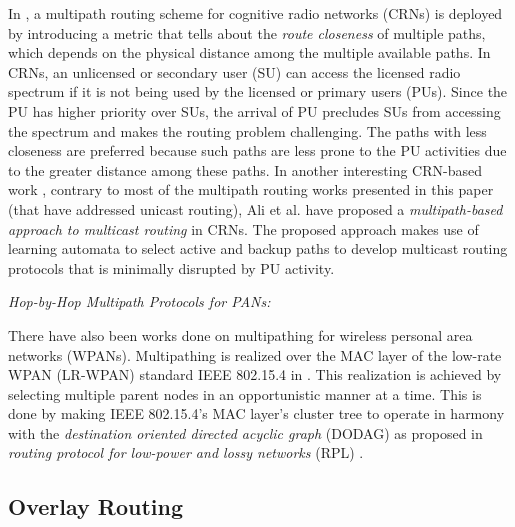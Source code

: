 \documentclass[10pt]{IEEEtran}
\begin{document}
In \cite{beltagy2011new}, a multipath routing scheme for cognitive radio networks (CRNs) is deployed by introducing a metric that tells about the \textit{route closeness} of multiple paths, which depends on the physical distance among the multiple available paths. In CRNs, an unlicensed or secondary user (SU) can access the licensed radio spectrum if it is not being used by the licensed or primary users (PUs). Since the PU has higher priority over SUs, the arrival of PU precludes SUs from accessing the spectrum and makes the routing problem challenging. The paths with less closeness are preferred because such paths are less prone to the PU activities due to the greater distance among these paths. In another interesting CRN-based work \cite{ali2015}, contrary to most of the multipath routing works presented in this paper (that have addressed unicast routing), Ali et al. have proposed a \textit{multipath-based approach to multicast routing} in CRNs. The proposed approach makes use of learning automata to select active and backup paths to develop multicast routing protocols that is minimally disrupted by PU activity. 

\vspace{2mm}
\textit{Hop-by-Hop Multipath Protocols for PANs:}
\vspace{1mm}


There have also been works done on multipathing for wireless personal area networks (WPANs). Multipathing is realized over the MAC layer of the low-rate WPAN (LR-WPAN) standard IEEE 802.15.4 in \cite{pavkovic2011multipath}. This realization is achieved by selecting multiple parent nodes in an opportunistic manner at a time. This is done by making IEEE 802.15.4's MAC layer's cluster tree to operate in harmony with the \emph{destination oriented directed acyclic graph} (DODAG) as proposed in \emph{routing protocol for low-power and lossy networks} (RPL) \cite{hui2012routing}. 







\subsection{Overlay Routing}
\label{subsec:overlay_routing}
\end{document}
